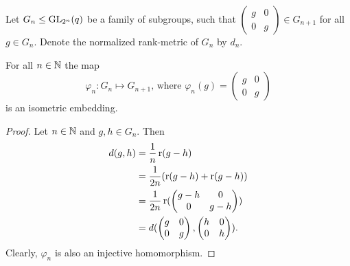 Let $G_n\leq \operatorname{GL}_{2^n}(q)$ be a family of subgroups, such that 
$\begin{pmatrix}
	g & 0 \\
	0 & g 
\end{pmatrix}\in G_{n+1}$ for all $g\in G_n$. Denote the normalized rank-metric of $G_n$ by $d_n$.
\begin{lemma}
	For all $n\in \mathbb{N}$ the map
	\[\varphi_n\colon G_n\mapsto G_{n+1}\text{, where }\varphi_n(g)=\begin{pmatrix}
		g &0\\
		0&g
	\end{pmatrix}\]
	is an isometric embedding. 
\end{lemma}
\begin{proof}
	Let $n\in\mathbb{N}$ and $g,h\in G_n$. Then
	\begin{align*}
		d(g,h) & =\frac{1}{n}\operatorname{r}(g-h)               \\
		       & =\frac{1}{2n}(\operatorname{r}(g-h)+\operatorname{r}(g-h)) \\
		       & =\frac{1}{2n}\operatorname{r} (                  
		\begin{pmatrix}
		g-h    & 0                                    \\
		0      & g-h                                  
		\end{pmatrix})\\
		       & =d(                                  
		\begin{pmatrix}
		g      & 0                                    \\
		0      & g                                    
		\end{pmatrix},
		\begin{pmatrix}
		h      & 0                                    \\
		0      & h                                    
		\end{pmatrix}).
	\end{align*}
	Clearly, $\varphi_n$ is also an injective homomorphism.
\end{proof}
		
